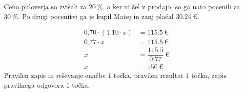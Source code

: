 \documentclass[addpoints]{exam}
\begin{document}
\begin{questions}
        \newpage


        \question
        Ceno puloverja so zvišali za $20~\%$, a ker ni šel v prodajo, so ga nato pocenili za $30~\%$.
        Po drugi pocenitvi ga je kupil Matej in zanj plačal $30.24~\euro$.


        \begin{solution}[4cm]
            \begin{align*}
                0.70\cdot \left(1.10\cdot x\right) &=115.5~\euro \\
                                     0.77 \cdot x &= 115.5~\euro \\
                                                x &= \dfrac{115.5}{0.77}~\euro \\
                                                x &= 150~\euro
            \end{align*}
            Pravilen zapis in reševanje enačbe $1$ točka, pravilen rezultat $1$ točka, zapis pravilnega odgovora $1$ točka.
        \end{solution}
     ~\\




\end{questions}
\end{document}
